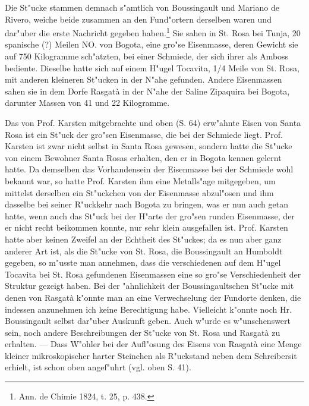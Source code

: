 \documentclass[a4paper, 11pt, oneside]{article}
\begin{document}
Die St"ucke stammen demnach s"amtlich von Boussingault und Mariano de Rivero, weiche beide zusammen an den Fund"ortern derselben waren und dar"uber die erste Nachricht gegeben haben.\footnote{Ann. de Chimie 1824, t. 25, p. 438.} Sie sahen in St. Rosa bei Tunja, 20 spanische (?) Meilen NO. von Bogota, eine gro"se Eisenmasse, deren Gewicht sie auf 750 Kilogramme sch"atzten, bei einer Schmiede, der sich ihrer als Amboss bediente. Dieselbe hatte sich auf einem H"ugel Tocavita, 1/4 Meile von St. Rosa, mit anderen kleineren St"ucken in der N"ahe gefunden. Andere Eisenmassen sahen sie in dem Dorfe Rasgatà in der N"ahe der Saline Zipaquira bei Bogota, darunter Massen von 41 und 22 Kilogramme.

Das von Prof. Karsten mitgebrachte und oben (S. 64) erw"ahnte Eisen von Santa Rosa ist ein St"uck der gro"sen Eisenmasse, die bei der Schmiede liegt. Prof. Karsten ist zwar nicht selbst in Santa Rosa gewesen, sondern hatte die St"ucke von einem Bewohner Santa Rosas erhalten, den er in Bogota kennen gelernt hatte. Da demselben das Vorhandensein der Eisenmasse bei der Schmiede wohl bekannt war, so hatte Prof. Karsten ihm eine Metalls"age mitgegeben, um mittelst derselben ein St"uckchen von der Eisenmasse abzul"osen und ihm dasselbe bei seiner R"uckkehr nach Bogota zu bringen, was er nun auch getan hatte, wenn auch das St"uck bei der H"arte der gro"sen runden Eisenmasse, der er nicht recht beikommen konnte, nur sehr klein ausgefallen ist. Prof. Karsten hatte aber keinen Zweifel an der Echtheit des St"uckes; da es nun aber ganz anderer Art ist, als die St"ucke von St. Rosa, die Boussingault an Humboldt gegeben, so m"usste man annehmen, dass die verschiedenen auf dem H"ugel Tocavita bei St. Rosa gefundenen Eisenmassen eine so gro"se Verschiedenheit der Struktur gezeigt haben. Bei der "ahnlichkeit der Boussingaultschen St"ucke mit denen von Rasgatà k"onnte man an eine Verwechselung der Fundorte denken, die indessen anzunehmen ich keine Berechtigung habe. Vielleicht k"onnte noch Hr. Boussingault selbst dar"uber Auskunft geben. Auch w"urde es w"unschenswert sein, noch andere Beschreibungen der St"ucke von St. Rosa und Rasgatà zu erhalten. --- Dass W"ohler bei der Aufl"osung des Eisens von Rasgatà eine Menge kleiner mikroskopischer harter Steinchen als R"uckstand neben dem Schreibersit erhielt, ist schon oben angef"uhrt (vgl. oben S. 41).
\end{document}
